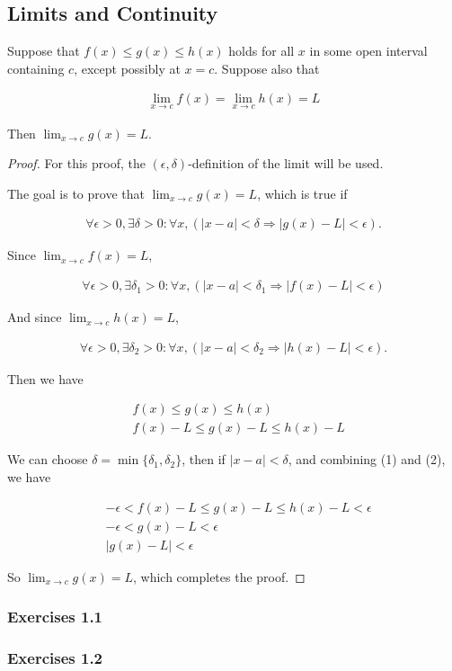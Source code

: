 \subsection{Limits and Continuity}

\begin{theo}
	Suppose that $f(x) \leq g(x) \leq h(x)$ holds for all $x$ in some open interval containing $c$, except possibly at $x=c$. Suppose also that
	
	\begin{align*}
		\lim_{x \rightarrow c} f(x) = \lim_{x \rightarrow c} h(x) = L
	\end{align*}
	
	Then $\lim_{x \rightarrow c} g(x) = L $.
\end{theo}

\begin{proof}
	For this proof, the $(\epsilon, \delta)$-definition of the limit will be used.
	
	The goal is to prove that $\lim_{x \rightarrow c} g(x) = L$, which is true if
	
	\begin{align*}
		\forall \epsilon > 0, \exists \delta > 0 : \forall x, (|x-a| < \delta \Rightarrow |g(x)-L| < \epsilon).
	\end{align*}
	
	Since $\lim_{x \rightarrow c} f(x) = L$,
	
	\begin{align}
		\forall \epsilon > 0, \exists \delta_1 > 0 : \forall x, (|x-a| < \delta_1 \Rightarrow |f(x)-L| < \epsilon)
	\end{align}
	
	And since $\lim_{x \rightarrow c} h(x) = L$,
	
	\begin{align}
		\forall \epsilon > 0, \exists \delta_2 > 0 : \forall x, (|x-a| < \delta_2 \Rightarrow |h(x)-L| < \epsilon).
	\end{align}
	
	Then we have 
	
	\begin{align*}
		&f(x) \leq g(x) \leq h(x) \\
		&f(x)-L \leq g(x)-L \leq h(x)-L
	\end{align*}
	
	We can choose $\delta = \min\{\delta_1, \delta_2\}$, then if $|x-a| < \delta$, and combining (1) and (2), we have
	
	\begin{align*}
		&-\epsilon < f(x)-L \leq g(x)-L \leq h(x)-L < \epsilon \\
		&-\epsilon < g(x)-L < \epsilon \\
		&|g(x)-L| < \epsilon
	\end{align*}
	
	So $\lim_{x \rightarrow c} g(x) = L$, which completes the proof.
\end{proof}

\subsubsection{Exercises 1.1}
\subsubsection{Exercises 1.2}









